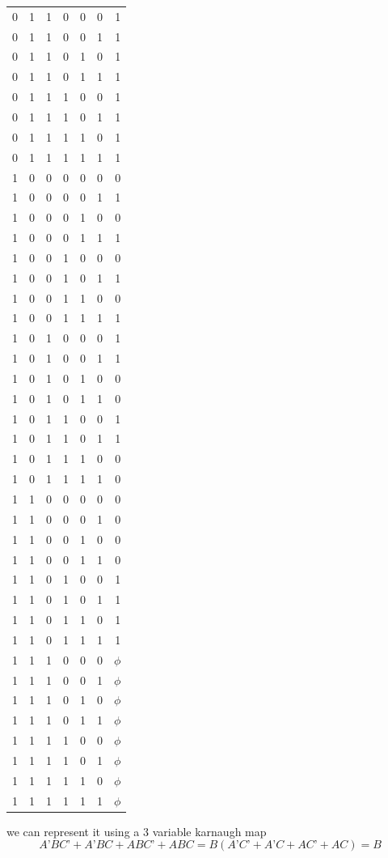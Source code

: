 \documentclass[a4paper,12pt]{article}
\begin{document}
\begin{definition}
\begin{my_example}
\begin{tabular}{rrrrrrr}
0 & 1 & 1 & 0 & 0 & 0 & 1\\
0 & 1 & 1 & 0 & 0 & 1 & 1\\
0 & 1 & 1 & 0 & 1 & 0 & 1\\
0 & 1 & 1 & 0 & 1 & 1 & 1\\
0 & 1 & 1 & 1 & 0 & 0 & 1\\
0 & 1 & 1 & 1 & 0 & 1 & 1\\
0 & 1 & 1 & 1 & 1 & 0 & 1\\
0 & 1 & 1 & 1 & 1 & 1 & 1\\
1 & 0 & 0 & 0 & 0 & 0 & 0\\
1 & 0 & 0 & 0 & 0 & 1 & 1\\
1 & 0 & 0 & 0 & 1 & 0 & 0\\
1 & 0 & 0 & 0 & 1 & 1 & 1\\
1 & 0 & 0 & 1 & 0 & 0 & 0\\
1 & 0 & 0 & 1 & 0 & 1 & 1\\
1 & 0 & 0 & 1 & 1 & 0 & 0\\
1 & 0 & 0 & 1 & 1 & 1 & 1\\
1 & 0 & 1 & 0 & 0 & 0 & 1\\
1 & 0 & 1 & 0 & 0 & 1 & 1\\
1 & 0 & 1 & 0 & 1 & 0 & 0\\
1 & 0 & 1 & 0 & 1 & 1 & 0\\
1 & 0 & 1 & 1 & 0 & 0 & 1\\
1 & 0 & 1 & 1 & 0 & 1 & 1\\
1 & 0 & 1 & 1 & 1 & 0 & 0\\
1 & 0 & 1 & 1 & 1 & 1 & 0\\
1 & 1 & 0 & 0 & 0 & 0 & 0\\
1 & 1 & 0 & 0 & 0 & 1 & 0\\
1 & 1 & 0 & 0 & 1 & 0 & 0\\
1 & 1 & 0 & 0 & 1 & 1 & 0\\
1 & 1 & 0 & 1 & 0 & 0 & 1\\
1 & 1 & 0 & 1 & 0 & 1 & 1\\
1 & 1 & 0 & 1 & 1 & 0 & 1\\
1 & 1 & 0 & 1 & 1 & 1 & 1\\
1 & 1 & 1 & 0 & 0 & 0 & \(\phi\)\\
1 & 1 & 1 & 0 & 0 & 1 & \(\phi\)\\
1 & 1 & 1 & 0 & 1 & 0 & \(\phi\)\\
1 & 1 & 1 & 0 & 1 & 1 & \(\phi\)\\
1 & 1 & 1 & 1 & 0 & 0 & \(\phi\)\\
1 & 1 & 1 & 1 & 0 & 1 & \(\phi\)\\
1 & 1 & 1 & 1 & 1 & 0 & \(\phi\)\\
1 & 1 & 1 & 1 & 1 & 1 & \(\phi\)\\
\end{tabular}
we can represent it using a 3 variable karnaugh map\\
\[ A’BC’ + A’BC + ABC’ + ABC = B(A’C’+A’C+AC’+AC) = B \]\\

\\
\end{my_example}
\end{definition}
\end{document}
